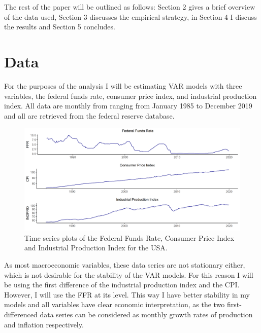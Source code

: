 \documentclass[12pt,a4paper]{article}
\begin{document}
The rest of the paper will be outlined as follows: Section 2 gives a brief overview of the data used, Section 3 discusses the empirical strategy, in Section 4 I discuss the results and Section 5 concludes.

\section{Data}

For the purposes of the analysis I will be estimating VAR models with three variables, the federal funds rate, consumer price index, and industrial production index. All data are monthly from ranging from January 1985 to December 2019 and all are retrieved from the federal reserve database. \\

\begin{center}
\begin{figure}[h!]
	\includegraphics[width=0.9\linewidth]{plot1.png}
		\caption{Time series plots of the Federal Funds Rate, Consumer Price Index and Industrial Production Index for the USA.}
\end{figure}
\end{center}

As most macroeconomic variables, these data series are not stationary either, which is not desirable for the stability of the VAR models. For this reason I will be using the first difference of the industrial production index and the CPI. However, I will use the FFR at its level. This way I have better stability in my models and all variables have clear economic interpretation, as the two first-differenced data series can be considered as monthly growth rates of production and inflation respectively.\\
\end{document}
